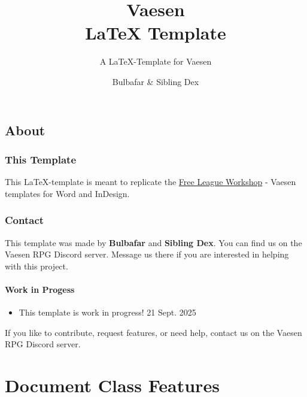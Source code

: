 \documentclass[english]{vaesen-supplement}
\title{Vaesen\\LaTeX Template}
\subtitle{A \LaTeX-Template for Vaesen}
\author{Bulbafar \& Sibling Dex}
\begin{document}
\maketitle

\tableofcontents

\chapter{About}

\section{This Template}
This \LaTeX-template is meant to replicate the \href{https://freeleaguepublishing.com/community-content/free-league-workshop/}{Free League Workshop} - Vaesen templates for Word and InDesign.


\section{Contact}
This template was made by \textbf{Bulbafar} and \textbf{Sibling Dex}. You can find us on the Vaesen RPG Discord server. Message us there if you are interested in helping with this project.

\begin{note}
\subsection{Work in Progess}

\begin{itemize}
    \item This template is work in progress!
     21 Sept. 2025
\end{itemize}

If you like to contribute, request features, or need help, contact us on the Vaesen RPG Discord server.
\end{note}

\part{Document Class Features}

\end{document}
